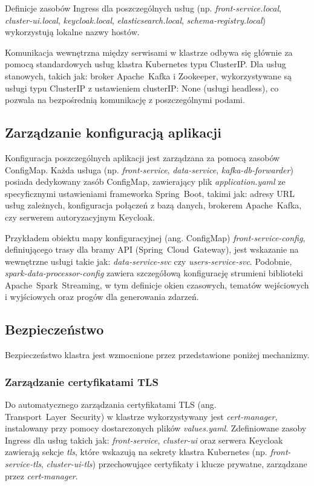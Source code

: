 Definicje zasobów Ingress dla poszczególnych usług (np. \textit{front-service.local}, \textit{cluster-ui.local}, \textit{keycloak.local}, \textit{elasticsearch.local}, \textit{schema-registry.local}) wykorzystują lokalne nazwy hostów.

Komunikacja wewnętrzna między serwisami w klastrze odbywa się głównie za pomocą standardowych usług klastra Kubernetes typu ClusterIP. Dla usług stanowych, takich jak: broker \mbox{Apache Kafka} i Zookeeper, wykorzystywane są usługi typu ClusterIP z ustawieniem clusterIP: None (usługi headless), co pozwala na bezpośrednią komunikację z poszczególnymi podami.

\subsection{Zarządzanie konfiguracją aplikacji} 

Konfiguracja poszczególnych aplikacji jest zarządzana za pomocą zasobów ConfigMap. Każda usługa (np. \textit{front-service}, \textit{data-service}, \textit{kafka-db-forwarder}) posiada dedykowany zasób \mbox{ConfigMap}, zawierający plik \textit{application.yaml} ze specyficznymi ustawieniami frameworka \mbox{Spring Boot}, takimi jak: adresy URL usług zależnych, konfiguracja połączeń z bazą danych, brokerem \mbox{Apache Kafka}, czy serwerem autoryzacyjnym Keycloak.

Przykładem obiektu mapy konfiguracyjnej (ang. \mbox{ConfigMap}) \textit{front-service-config}, definiującego trasy dla bramy API (\mbox{Spring Cloud Gateway}), jest wskazanie na wewnętrzne usługi takie jak: \textit{data-service-svc} czy \textit{users-service-svc}. Podobnie, \textit{spark-data-processor-config} zawiera szczegółową konfigurację strumieni biblioteki \mbox{Apache Spark Streaming}, w tym definicje okien czasowych, tematów wejściowych i wyjściowych oraz progów dla generowania zdarzeń.

\subsection{Bezpieczeństwo}

Bezpieczeństwo klastra jest wzmocnione przez przedstawione poniżej mechanizmy.

\subsubsection{Zarządzanie certyfikatami TLS}
Do automatycznego zarządzania certyfikatami TLS (ang. \mbox{Transport Layer Security}) w klastrze wykorzystywany jest \textit{cert-manager}, instalowany przy pomocy dostarczonych plików \textit{values.yaml}. Zdefiniowane zasoby Ingress dla usług takich jak: \textit{front-service}, \textit{cluster-ui} oraz serwera Keycloak zawierają sekcje \textit{tls}, które wskazują na sekrety klastra Kubernetes (np. \textit{front-service-tls}, \textit{cluster-ui-tls}) przechowujące certyfikaty i klucze prywatne, zarządzane przez \textit{cert-manager}.

